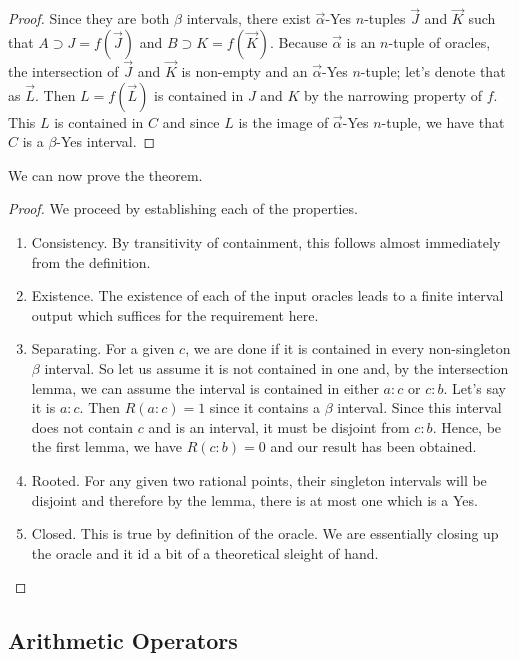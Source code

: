 \documentclass[12pt]{article}
\theoremstyle{remark}
\begin{document}
\begin{proof}
Since they are both $\beta$ intervals, there exist $\vec{\alpha}$-Yes $n$-tuples $\vec{J}$ and $\vec{K}$ such that $A \supset J = f(\vec{J})$ and $B \supset K= f(\vec{K})$. Because $\vec{\alpha}$ is an $n$-tuple of oracles, the intersection of $\vec{J}$ and $\vec{K}$ is non-empty and an $\vec{\alpha}$-Yes $n$-tuple; let's denote that as $\vec{L}$. Then $L = f(\vec{L})$ is contained in $J$ and $K$ by the narrowing property of $f$. This $L$ is contained in $C$ and since $L$ is the image of $\vec{\alpha}$-Yes $n$-tuple, we have that $C$ is a $\beta$-Yes interval. 
\end{proof}

We can now prove the theorem. 

\begin{proof}
We proceed by establishing each of the properties. 

\begin{enumerate}
    \item Consistency. By transitivity of containment, this follows almost immediately from the definition. 
    \item Existence. The existence of each of the input oracles leads to a finite interval output which suffices for the requirement here. 
    \item Separating. For a given $c$, we are done if it is contained in every non-singleton $\beta$ interval. So let us assume it is not contained in one and, by the intersection lemma, we can assume the interval is contained in either $a:c$ or $c:b$. Let's say it is $a:c$. Then $R(a:c)=1$ since it contains a $\beta$ interval. Since this interval does not contain $c$ and is an interval, it must be disjoint from $c:b$. Hence, be the first lemma, we have $R(c:b)=0$ and our result has been obtained.
    \item Rooted. For any given two rational points, their singleton intervals will be disjoint and therefore by the lemma, there is at most one which is a Yes. 
    \item Closed. This is true by definition of the oracle. We are essentially closing up the oracle and it id a bit of a theoretical sleight of hand.
\end{enumerate}

\end{proof}


\subsection{Arithmetic Operators}
\end{document}
